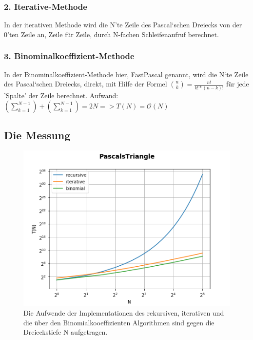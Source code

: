 \documentclass[
   draft=false
  ,paper=a4
  ,twoside=false
  ,fontsize=11pt
  ,headsepline
  ,DIV11
  ,parskip=full+
]{scrartcl} %
\begin{document}
\subsubsection*{2. Iterative-Methode}
In der iterativen Methode wird die N'te Zeile des Pascal`schen Dreiecks von der 0'ten Zeile an, Zeile für Zeile, durch N-fachen Schleifenaufruf berechnet.
$ $

\subsubsection*{3. Binominalkoeffizient-Methode}
In der Binominalkoeffizient-Methode hier, FastPascal genannt, wird die N`te Zeile des Pascal`schen Dreiecks, direkt, mit Hilfe der Formel 
$\binom{n}{k} = \frac{n!}{k!*(n-k)!}$ 
für jede 'Spalte' der Zeile berechnet.
Aufwand: $(\sum\nolimits_{k=1}^{N-1})+(\sum\nolimits_{k=1}^{N-1}) = 2N => T(N) = \mathcal O(N)$ 


\flushleft
\subsection*{Die Messung}
	
\begin{figure}[htp]
	\label{fig:recuriterfast}
  	\centering
    \includegraphics[width=\textwidth]{./IMG/PascalsTriangle.png}
    \caption[recur iter fast]{Die Aufwende der Implementationen des rekursiven, iterativen und die über den Binomialkooeffizienten Algorithmen sind gegen die Dreieckstiefe N aufgetragen.}
\end{figure}
	
\end{document}
